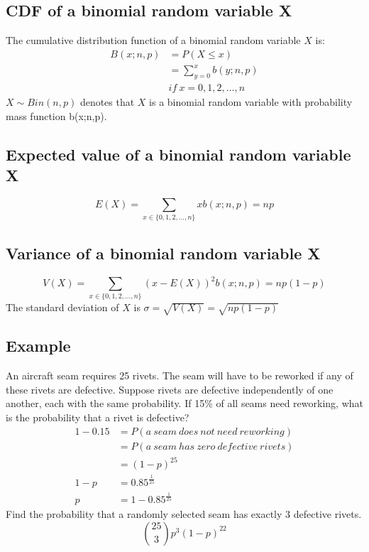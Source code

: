 \documentclass[letterpaper, 12pt]{math}
\begin{document}
\subsection*{CDF of a binomial random variable X}
The cumulative distribution function of a binomial random variable \( X \) is:
\begin{align*}
  B(x;n,p) &= P(X\leq x) \\
  &= \sum_{y=0}^{x}b(y;n,p) \\
  & if\ x = 0,1,2,\dots,n
\end{align*}
\( X\sim Bin(n,p) \) denotes that \( X \) is a binomial random variable with
probability mass function b(x;n,p).

\subsection*{Expected value of a binomial random variable X}
\[ E(X) = \sum_{x\in\{0,1,2,\dots,n\}}xb(x;n,p) = np \]

\subsection*{Variance of a binomial random variable X}
\[ V(X) = \sum_{x\in\{0,1,2,\dots,n\}}(x-E(X))^{2}b(x;n,p) = np(1-p) \]
The standard deviation of \( X \) is \( \sigma = \sqrt{V(X)} = \sqrt{np(1-p)} \)

\subsection*{Example}
An aircraft seam requires 25 rivets. The seam will have to be reworked if any
of these rivets are defective. Suppose rivets are defective independently of
one another, each with the same probability. If 15\% of all seams need
reworking, what is the probability that a rivet is defective?
\begin{align*}
  1-0.15 &= P(a\ seam\ does\ not\ need\ reworking) \\
  &= P(a\ seam\ has\ zero\ defective\ rivets) \\
  &= (1-p)^{25} \\
  1-p &= 0.85^{\frac{1}{25}} \\
  p &= 1-0.85^{\frac{1}{25}}
\end{align*}
Find the probability that a randomly selected seam has exactly 3 defective
rivets.
\[ \binom{25}{3}p^{3}(1-p)^{22} \]
\end{document}

